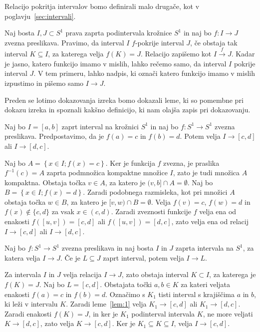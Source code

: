 \documentclass[../TG_magistrsko_delo_sections.tex]{subfiles}
\begin{document}
Relacijo pokritja intervalov bomo definirali malo drugače, kot v poglavju~\ref{sec:intervali}.

\begin{definicija}\label{def:pokritja}
Naj bosta $I, J \subset S^1$ prava zaprta podintervala krožnice $S^1$ in naj bo $f: I \to J$ zvezna preslikava. Pravimo, da interval $I$ $f$-pokrije interval $J$, če obstaja tak interval $K \subseteq I$, za katerega velja $f(K) = J$. Relacijo zapišemo kot $I \xrightarrow{f} J$. Kadar je jasno, katero funkcijo imamo v mislih, lahko rečemo samo, da interval $I$ pokrije interval $J$. V tem primeru, lahko nadpis, ki označi katero funkcijo imamo v mislih izpustimo in pišemo samo $I \to J$.
\end{definicija}

Preden se lotimo dokazovanja izreka bomo dokazali leme, ki so pomembne pri dokazu izreka in spoznali kakšno definicijo, ki nam olajša zapis pri dokazovanju.

\begin{lema}\label{lem:1}					%
Naj bo $I=[a, b]$ zaprt interval na krožnici $S^1$ in naj bo $f : S^1 \to S^1$ zvezna preslikava. Predpostavimo, da je $f(a) = c$ in $f(b) =d$. Potem velja $I \to [c, d]$ ali $I \to [d, c]$.
\end{lema}

\begin{dokaz}
Naj bo $A = \left\{x \in I; f(x) = c \right\}$. Ker je funkcija $f$ zvezna, je praslika $f^{-1}(c) = A$ zaprta podmnožica kompaktne množice $I$, zato je tudi množica $A$ kompaktna. Obstaja točka $v \in A$, za katero je $(v, b] \cap A = \emptyset$. Naj bo $B = \left\{x \in I; f(x) = d \right\}$. Zaradi podobnega razmisleka, kot pri množici $A$ obstaja točka $w \in B$, za katero je $[v, w) \cap B = \emptyset$. Velja $f(v) = c$, $f(w)=d$ in $f(x) \notin \{c, d\}$ za vsak $x \in (c, d)$. Zaradi zveznosti funkcije $f$ velja ena od enakosti $f([u, v]) = [c, d]$ ali $f([u, v]) = [d, c]$, zato velja ena od relacij $I \to [c, d]$ ali $I \to [d, c]$.
\end{dokaz}

\begin{lema}\label{lem:2}		%
Naj bo $f : S^1 \to S^1$ zvezna preslikava in naj bosta $I$ in $J$ zaprta intervala na $S^1$, za katera velja $I \to J$. Če je $L \subseteq J$ zaprt interval, potem velja $I \to L$.
\end{lema}

\begin{dokaz}
Za intervala $I$ in $J$ velja relacija $I \to J$, zato obstaja interval $K \subset I$, za katerega je $f(K) = J$. Naj bo $L = [c, d]$. Obstajata točki $a, b \in K$ za kateri veljata enakosti $f(a) = c$ in $f(b)=d$. Označimo s $K_1$ tisti interval s krajiščima $a$ in $b$, ki leži v intervalu $K$. Zaradi leme~\ref{lem:1} velja $K_1 \to [c, d]$ ali $K_1 \to [d, c]$. Zaradi enakosti $f(K) = J$, in ker je $K_1$ podinterval intervala $K$, ne more veljati $K \to [d, c]$, zato velja $K \to [c, d]$. Ker je $K_1 \subseteq K \subseteq I$, velja $I \to [c, d]$.
\end{dokaz}
\end{document}

